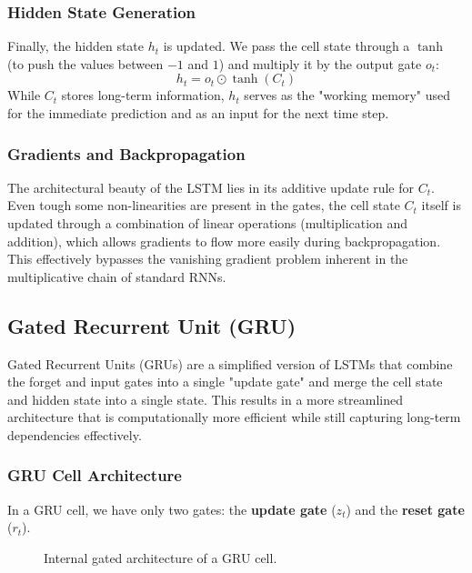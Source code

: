 \subsubsection{Hidden State Generation}
Finally, the hidden state $h_t$ is updated. 
We pass the cell state through a $\tanh$ (to push the values between $-1$ and $1$) and multiply it by the output gate $o_t$:
\begin{equation}
    h_t = o_t \odot \tanh(C_t)
\end{equation}
While $C_t$ stores long-term information, $h_t$ serves as the "working memory" used for the immediate prediction and as an input for the next time step.

\subsubsection{Gradients and Backpropagation}
The architectural beauty of the LSTM lies in its additive update rule for $C_t$.
Even tough some non-linearities are present in the gates, the cell state $C_t$ itself is updated through a combination of linear operations (multiplication and addition),
which allows gradients to flow more easily during backpropagation.
This effectively bypasses the vanishing gradient problem inherent in the multiplicative chain of standard RNNs.

\subsection{Gated Recurrent Unit (GRU)}
Gated Recurrent Units (GRUs) are a simplified version of LSTMs that combine the forget and input gates into a single "update gate" and merge the cell state and hidden state into a single state.
This results in a more streamlined architecture that is computationally more efficient while still capturing long-term dependencies effectively.

\subsubsection{GRU Cell Architecture}
In a GRU cell, we have only two gates: the \textbf{update gate} ($z_t$) and the \textbf{reset gate} ($r_t$).

\begin{figure}[H]
    \centering
    \resizebox{.8\textwidth}{!}{
        
    }
    \caption{Internal gated architecture of a GRU cell.}
\end{figure}


